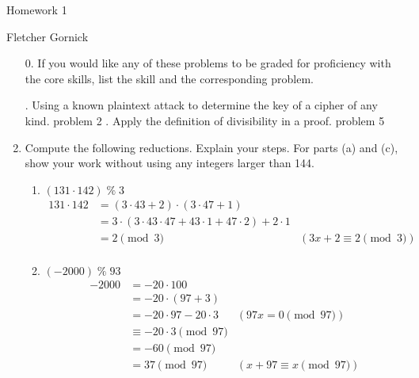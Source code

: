 \documentclass[12pt]{article}
\newcommand{\n}{\vspace{0.5cm}}
\newcommand{\mmod}{\;\%\;}
\begin{document}
\begin{center}
  {\Large Homework 1} \n

  Fletcher Gornick
\end{center}

\begin{enumerate}
\item[0.] If you would like any of these problems to be graded for proficiency with the core skills, list the skill and the corresponding problem.
  \begin{outline}
    . Using a known plaintext attack to determine the key of a cipher of any kind.
      \2 problem 2
    . Apply the definition of divisibility in a proof.
      \2 problem 5
  \end{outline} \n

\item Compute the following reductions.  Explain your steps.  For parts (a) and (c), show your work without using any integers larger than 144. 
\begin{enumerate}
  \item $(131\cdot 142) \mmod 3$ 
    \begin{align*}
      131 \cdot 142 &= (3 \cdot 43 + 2) \cdot (3 \cdot 47 + 1) \\
                    &= 3 \cdot (3 \cdot 43 \cdot 47 + 43 \cdot 1 + 47 \cdot 2) + 2 \cdot 1 \\
                    &= 2 \pmod3 &(3x + 2 \equiv 2 \pmod {3}) \\
  \end{align*}

  \item $(-2000) \mmod 93$
  \begin{align*}
      -2000 &= -20 \cdot 100 \\
            &= -20 \cdot (97 + 3) \\
            &= -20 \cdot 97 - 20 \cdot 3 &(97x = 0 \pmod {97}) \\
            &\equiv -20 \cdot 3 \pmod{97} \\
            &= -60 \pmod{97} \\
            &= 37 \pmod{97} &(x + 97 \equiv x \pmod {97}) \\
  \end{align*}


\end{enumerate}
\end{enumerate}
\end{document}
